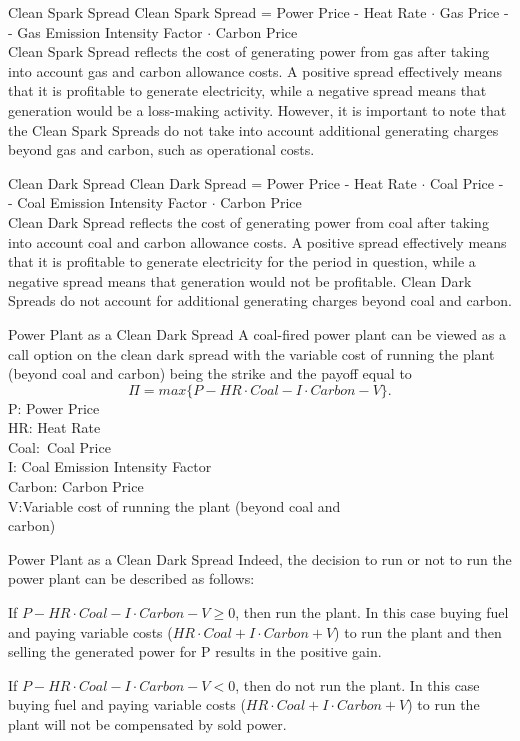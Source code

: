 {Clean Spark Spread}
Clean Spark Spread = Power Price - Heat Rate $\cdot$ Gas Price -\\- Gas Emission Intensity Factor $\cdot$ Carbon Price\\
  \vspace{0.6cm}
Clean Spark Spread reflects the cost of generating power from gas after taking into account gas and carbon allowance costs. A positive spread effectively means that it is profitable to generate electricity, while a negative spread means that generation would be a loss-making activity. However, it is important to note that the Clean Spark Spreads do not take into account additional generating charges beyond gas and carbon, such as operational costs.

{Clean Dark Spread}
Clean Dark Spread = Power Price - Heat Rate $\cdot$ Coal Price -\\- Coal Emission Intensity Factor $\cdot$ Carbon Price\\
  \vspace{0.6cm}
Clean Dark Spread reflects the cost of generating power from coal after taking into account coal and carbon allowance costs. A positive spread effectively means that it is profitable to generate electricity for the period in question, while a negative spread means that generation would not be profitable. Clean Dark Spreads do not account for additional generating charges beyond coal and carbon.

{Power Plant as a Clean Dark Spread}
A coal-fired power plant can be viewed as a call option on the clean dark spread with the variable cost of running the plant (beyond coal and carbon) being the strike and the payoff equal to\\
$$\Pi=max\{P-HR\cdot Coal - I\cdot Carbon - V\}.$$
P:\quad\;\;\;\;\; Power Price\\
HR:\quad\;\;\; Heat Rate\\
Coal:\quad\, Coal Price\\
I:\qquad\;\;\; Coal Emission Intensity Factor\\
Carbon: Carbon Price\\
V:\qquad\quad Variable cost of running the plant (beyond coal and\\
\qquad\quad\;\;\; carbon)

{Power Plant as a Clean Dark Spread}
Indeed, the decision to run or not to run the power plant can be described as follows:
  \item If $P-HR\cdot Coal - I\cdot Carbon - V\geq0$, then run the plant. In this case buying fuel and paying variable costs ($HR\cdot Coal + I\cdot Carbon + V$) to run the plant and then selling the generated power for P results in the positive gain.
  \item If $P-HR\cdot Coal - I\cdot Carbon - V<0$, then do not run the plant. In this case buying fuel and paying variable costs ($HR\cdot Coal + I\cdot Carbon + V$) to run the plant will not be compensated by sold power.

